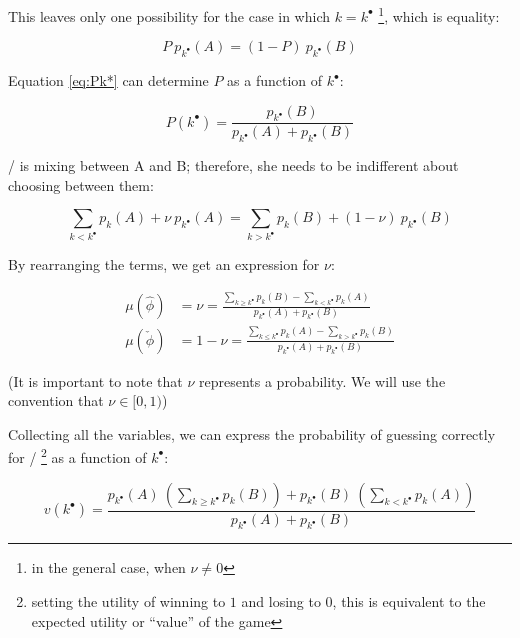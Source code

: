 \documentclass{article}
\theoremstyle{definition}
\begin{document}
This leaves only one possibility for the case in which $k=k^\bullet$ \footnote{in the general case, when $\nu \ne 0$}, which is equality:

\begin{equation}
    \label{eq:Pk*}
    P \  p_{k^\bullet}(A) = (1-P) \ p_{k^\bullet}(B)
\end{equation}

Equation \eqref{eq:Pk*} can determine $P$ as a function of $k^\bullet$:

\begin{equation}
    P(k^\bullet) = \frac{p_{k^\bullet}(B)}{p_{k^\bullet}(A)+p_{k^\bullet}(B)}
\end{equation}


\PII/ is mixing between A and B; therefore, she needs to be indifferent about choosing between them:

\begin{equation}
    \sum_{k<k^\bullet} p_k(A) + \nu \ p_{k^\bullet}(A) = \sum_{k>k^\bullet} p_k(B) + (1-\nu) \ p_{k^\bullet}(B)
\end{equation}

By rearranging the terms, we get an expression for $\nu$:


\begin{equation}
    \label{eq:nuk*}
    \begin{split}
        \mu(\hat{\phi}) &= \nu = \frac{\sum_{k \ge k^\bullet} p_k(B) - \sum_{k < k^\bullet} p_k(A)}{p_{k^\bullet}(A)+p_{k^\bullet}(B)} \\
        \mu(\check{\phi}) &= 1 - \nu = \frac{\sum_{k \leq k^\bullet} p_k(A) - \sum_{k > k^\bullet} p_k(B)}{p_{k^\bullet}(A)+p_{k^\bullet}(B)}
    \end{split}
\end{equation}

(It is important to note that $\nu$ represents a probability. We will use the convention that $\nu \in [0,1)$)

Collecting all the variables, we can express the probability of guessing correctly for \PI/ \footnote{setting the utility of winning to $1$ and losing to $0$, this is equivalent to the expected utility or ``value'' of the game} as a function of $k^\bullet$:

\begin{equation}
    v(k^\bullet) =  \frac{p_{k^\bullet}(A) \ \left (\sum_{k \ge k^\bullet} p_k(B) \right ) + p_{k^\bullet}(B) \ \left (\sum_{k < k^\bullet} p_k(A) \right )}{p_{k^\bullet}(A)+p_{k^\bullet}(B)}
\end{equation}
\end{document}
